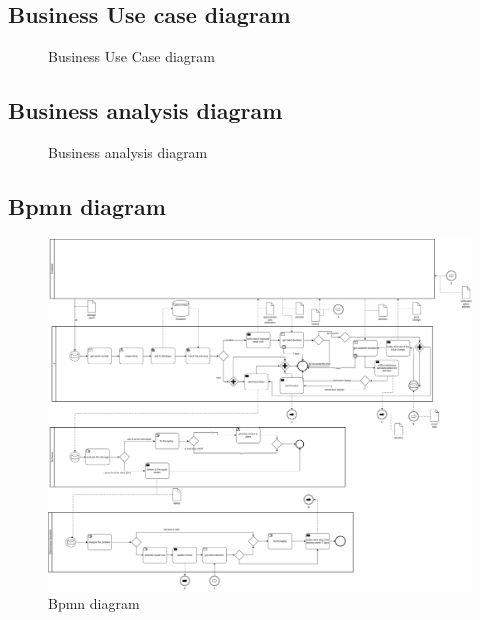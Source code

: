 \documentclass[12pt]{article}
\begin{document}
  \clearpage
  \subsection{Business Use case diagram}

  \FloatBarrier
  \begin{figure}[!htbp]
    \centering
    \def\svgwidth{\columnwidth}
    
    \caption{Business Use Case diagram}
  \end{figure}
  \FloatBarrier

  \subsection{Business analysis diagram}

  \FloatBarrier
  \begin{figure}[!htbp]
    \centering
    \def\svgwidth{\columnwidth}
    \scalebox{0.8}{}
    \caption{Business analysis diagram}
  \end{figure}
  \FloatBarrier

  \subsection{Bpmn diagram}

  \FloatBarrier
  \begin{figure}[!htbp]
    \centering
    \includegraphics[width=1\textwidth]{bpmn_not_optimized.png}
    \caption{Bpmn diagram}
  \end{figure}
  \FloatBarrier
\end{document}
